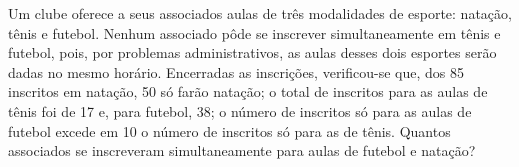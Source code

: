 \documentclass[10pt,a4paper]{article}
\begin{document}
\begin{multicols}{2}
\begin{question}[type=exam]
    \end{question}

    \begin{question}[type=exam]
      Um clube oferece a seus associados aulas de três modalidades de esporte: natação, tênis e futebol. Nenhum associado pôde se inscrever 
      simultaneamente em tênis e futebol, pois, por problemas administrativos, as aulas desses dois esportes serão dadas no mesmo horário. 
      Encerradas as inscrições, verificou-se que, dos 85 inscritos em natação, 50 só farão natação; o total de inscritos para as aulas de tênis 
      foi de 17 e, para futebol, 38; o número de inscritos só para as aulas de futebol excede em 10 o número de inscritos só para as de tênis. 
      Quantos associados se inscreveram simultaneamente para aulas de futebol e natação?

    \end{question}

		\clearpage
	\end{multicols}
        
          
\end{document}
